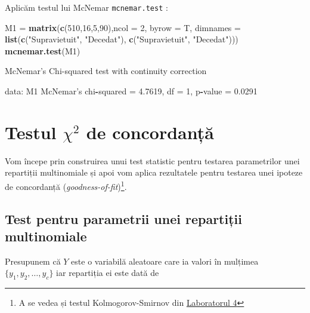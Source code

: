\documentclass[]{article}
\newenvironment{Shaded}{\begin{snugshade}}{\end{snugshade}}
\newcommand{\KeywordTok}[1]{\textcolor[rgb]{0.13,0.29,0.53}{\textbf{#1}}}
\newcommand{\DataTypeTok}[1]{\textcolor[rgb]{0.13,0.29,0.53}{#1}}
\newcommand{\DecValTok}[1]{\textcolor[rgb]{0.00,0.00,0.81}{#1}}
\newcommand{\FloatTok}[1]{\textcolor[rgb]{0.00,0.00,0.81}{#1}}
\newcommand{\StringTok}[1]{\textcolor[rgb]{0.31,0.60,0.02}{#1}}
\newcommand{\OperatorTok}[1]{\textcolor[rgb]{0.81,0.36,0.00}{\textbf{#1}}}
\newcommand{\NormalTok}[1]{#1}
\let\rmarkdownfootnote\footnote%
\def\footnote{\protect\rmarkdownfootnote}
\begin{document}
Aplicăm testul lui McNemar \texttt{mcnemar.test} :

\begin{Shaded}
\begin{Highlighting}[]
\NormalTok{M1 =}\StringTok{ }\KeywordTok{matrix}\NormalTok{(}\KeywordTok{c}\NormalTok{(}\DecValTok{510}\NormalTok{,}\DecValTok{16}\NormalTok{,}\DecValTok{5}\NormalTok{,}\DecValTok{90}\NormalTok{),}\DataTypeTok{ncol =} \DecValTok{2}\NormalTok{, }\DataTypeTok{byrow =}\NormalTok{ T, }
           \DataTypeTok{dimnames =} \KeywordTok{list}\NormalTok{(}\KeywordTok{c}\NormalTok{(}\StringTok{"Supravietuit"}\NormalTok{, }\StringTok{"Decedat"}\NormalTok{), }
                           \KeywordTok{c}\NormalTok{(}\StringTok{"Supravietuit"}\NormalTok{, }\StringTok{"Decedat"}\NormalTok{)))}
\KeywordTok{mcnemar.test}\NormalTok{(M1)}

\NormalTok{    McNemar}\StringTok{'s Chi-squared test with continuity correction}

\StringTok{data:  M1}
\StringTok{McNemar'}\NormalTok{s chi}\OperatorTok{-}\NormalTok{squared =}\StringTok{ }\FloatTok{4.7619}\NormalTok{, df =}\StringTok{ }\DecValTok{1}\NormalTok{, p}\OperatorTok{-}\NormalTok{value =}\StringTok{ }\FloatTok{0.0291}
\end{Highlighting}
\end{Shaded}

\section{\texorpdfstring{Testul \(\chi^2\) de
concordanță}{Testul \textbackslash{}chi\^{}2 de concordanță}}\label{testul-chi2-de-concordanta}

Vom începe prin construirea unui test statistic pentru testarea
parametrilor unei repartiții multinomiale și apoi vom aplica rezultatele
pentru testarea unei ipoteze de concordanță
(\emph{goodness-of-fit})\footnote{A se vedea și testul
  Kolmogorov-Smirnov din
  \href{https://alexamarioarei.github.io/Teaching/2017-2018/Biostat\%20web\%20page/labs/Lab_4.pdf}{Laboratorul
  4}}.

\subsection{Test pentru parametrii unei repartiții
multinomiale}\label{test-pentru-parametrii-unei-repartitii-multinomiale}

Presupunem că \(Y\) este o variabilă aleatoare care ia valori în
mulțimea \(\{y_1,y_2,\ldots,y_c\}\) iar repartiția ei este dată de
\end{document}
